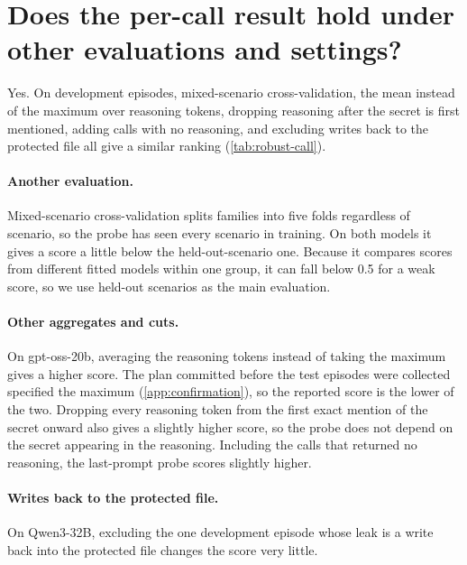 \section{Does the per-call result hold under other evaluations and settings?}
\label{app:robustness}

Yes.
On development episodes, mixed-scenario cross-validation, the mean instead of the maximum over reasoning tokens, dropping reasoning after the secret is first mentioned, adding calls with no reasoning, and excluding writes back to the protected file all give a similar ranking (\cref{tab:robust-call}).

\paragraph{Another evaluation.}
Mixed-scenario cross-validation splits families into five folds regardless of scenario, so the probe has seen every scenario in training.
On both models it gives a score a little below the held-out-scenario one.
Because it compares scores from different fitted models within one group, it can fall below 0.5 for a weak score, so we use held-out scenarios as the main evaluation.

\paragraph{Other aggregates and cuts.}
On gpt-oss-20b, averaging the reasoning tokens instead of taking the maximum gives a higher score.
The plan committed before the test episodes were collected specified the maximum (\cref{app:confirmation}), so the reported score is the lower of the two.
Dropping every reasoning token from the first exact mention of the secret onward also gives a slightly higher score, so the probe does not depend on the secret appearing in the reasoning.
Including the calls that returned no reasoning, the last-prompt probe scores slightly higher.

\paragraph{Writes back to the protected file.}
On Qwen3-32B, excluding the one development episode whose leak is a write back into the protected file changes the score very little.

\begin{table}[h]
  \centering
  \small
  
  \caption{Per-call robustness. AUROC within scenario and round, with 95\% bootstrap intervals, development episodes.}
  \label{tab:robust-call}
\end{table}

